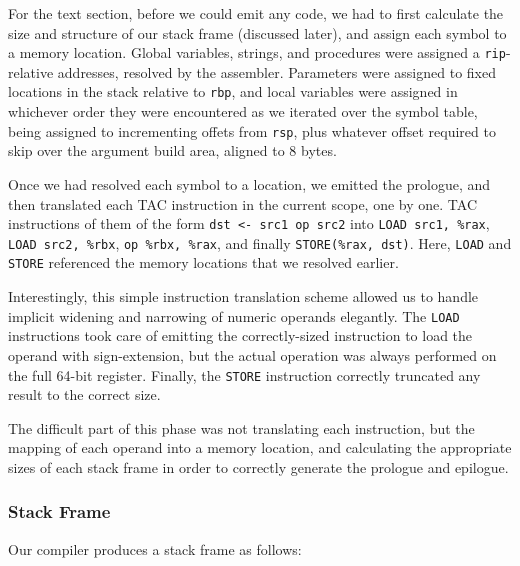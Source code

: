\documentclass{article}
\begin{document}
For the text section, before we could emit any code, we had to first calculate
the size and structure of our stack frame (discussed later), and assign each
symbol to a memory location. Global variables, strings, and procedures were
assigned a \texttt{rip}-relative addresses, resolved by the assembler.
Parameters were assigned to fixed locations in the stack relative to
\texttt{rbp}, and local variables were assigned in whichever order they were
encountered as we iterated over the symbol table, being assigned to incrementing
offets from \texttt{rsp}, plus whatever offset required to skip over the
argument build area, aligned to 8 bytes.

Once we had resolved each symbol to a location, we emitted the prologue, and
then translated each TAC instruction in the current scope, one by one. TAC
instructions of them of the form \texttt{dst <- src1 op src2} into \texttt{LOAD
	src1, \%rax}, \texttt{LOAD src2, \%rbx}, \texttt{op \%rbx, \%rax}, and finally
\texttt{STORE(\%rax, dst)}. Here, \texttt{LOAD} and \texttt{STORE} referenced
the memory locations that we resolved earlier.

Interestingly, this simple instruction translation scheme allowed us to handle
implicit widening and narrowing of numeric operands elegantly. The \texttt{LOAD}
instructions took care of emitting the correctly-sized instruction to load the
operand with sign-extension, but the actual operation was always performed on
the full 64-bit register. Finally, the \texttt{STORE} instruction correctly
truncated any result to the correct size.

The difficult part of this phase was not translating each instruction, but the
mapping of each operand into a memory location, and calculating the appropriate
sizes of each stack frame in order to correctly generate the prologue and
epilogue.

\subsubsection{Stack Frame}

Our compiler produces a stack frame as follows:
\end{document}
